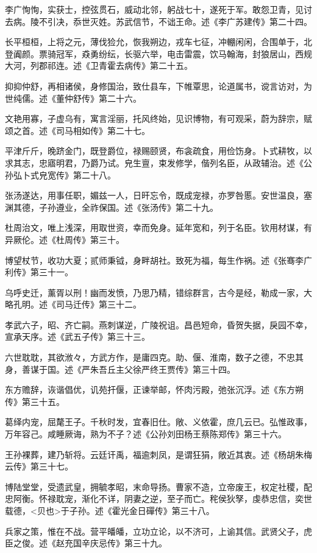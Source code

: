 \documentclass[]{article}
\begin{document}
李广恂恂，实获士，控弦贯石，威动北邻，躬战七十，遂死于军。敢怨卫青，见讨去病。陵不引决，忝世灭姓。苏武信节，不诎王命。述《李广苏建传》第二十四。

长平桓桓，上将之元，薄伐猃允，恢我朔边，戎车七征，冲輣闲闲，合围单于，北登阗颜。票骑冠军，猋勇纷纭，长驱六举，电击雷震，饮马翰海，封狼居山，西规大河，列郡祁连。述《卫青霍去病传》第二十五。

抑抑仲舒，再相诸侯，身修国治，致仕县车，下帷覃思，论道属书，谠言访对，为世纯儒。述《董仲舒传》第二十六。

文艳用寡，子虚乌有，寓言淫丽，托风终始，见识博物，有可观采，蔚为辞宗，赋颂之首。述《司马相如传》第二十七。

平津斤斤，晚跻金门，既登爵位，禄赐颐贤，布衾疏食，用俭饬身。卜式耕牧，以求其志，忠寤明君，乃爵乃试。皃生亶，束发修学，偕列名臣，从政辅治。述《公孙弘卜式皃宽传》第二十八。

张汤遂达，用事任职，媚兹一人，日旰忘令，既成宠禄，亦罗咎慝。安世温良，塞渊其德，子孙遵业，全祚保国。述《张汤传》第二十九。

杜周治文，唯上浅深，用取世资，幸而免身。延年宽和，列于名臣。钦用材谋，有异厥伦。述《杜周传》第三十。

博望杖节，收功大夏；贰师秉钺，身畔胡社。致死为福，每生作祸。述《张骞李广利传》第三十一。

乌呼史迁，薰胥以刑！幽而发愤，乃思乃精，错综群言，古今是经，勒成一家，大略孔明。述《司马迁传》第三十二。

孝武六子，昭、齐亡嗣。燕刺谋逆，广陵祝诅。昌邑短命，昏贺失据，戾园不幸，宣承天序。述《武五子传》第三十三。

六世耽耽，其欲浟々，方武方作，是庸四克。助、偃、淮南，数子之德，不忠其身，善谋于国。述《严朱吾丘主父徐严终王贾传》第三十四。

东方赡辞，诙谐倡优，讥苑扞偃，正谏举邮，怀肉污殿，弛张沉浮。述《东方朔传》第三十五。

葛绎内宠，屈氂王子。千秋时发，宜春旧仕。敞、义依霍，庶几云已。弘惟政事，万年容己。咸睡厥诲，熟为不子？述《公孙刘田杨王蔡陈郑传》第三十六。

王孙裸葬，建乃斩将。云廷讦禹，福逾刺凤，是谓狂狷，敞近其衷。述《杨胡朱梅云传》第三十七。

博陆堂堂，受遗武皇，拥毓孝昭，末命导扬。曹家不造，立帝废王，权定社稷，配忠阿衡。怀禄耽宠，渐化不详，阴妻之逆，至子而亡。秺侯狄孥，虔恭忠信，奕世载德，\textless{}贝也\textgreater{}于子孙。述《霍光金日磾传》第三十八。

兵家之策，惟在不战。营平皤皤，立功立论，以不济可，上谕其信。武贤父子，虎臣之俊。述《赵充国辛庆忌传》第三十九。
\end{document}
